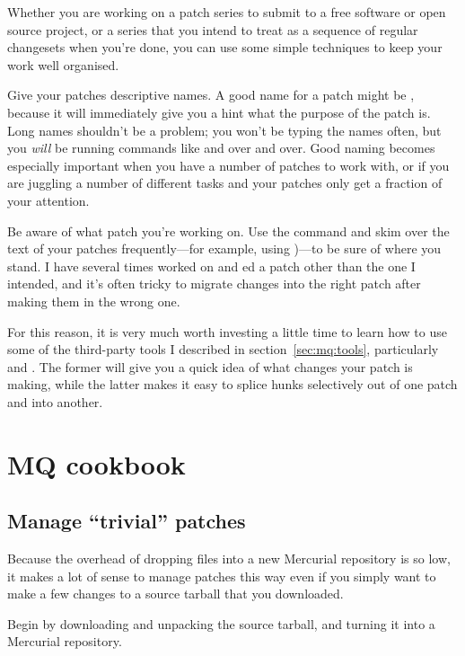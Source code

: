 Whether you are working on a patch series to submit to a free software
or open source project, or a series that you intend to treat as a
sequence of regular changesets when you're done, you can use some
simple techniques to keep your work well organised.

Give your patches descriptive names.  A good name for a patch might be
, because it will immediately give
you a hint what the purpose of the patch is.  Long names shouldn't be
a problem; you won't be typing the names often, but you \emph{will} be
running commands like  and  over and over.
Good naming becomes especially important when you have a number of
patches to work with, or if you are juggling a number of different
tasks and your patches only get a fraction of your attention.

Be aware of what patch you're working on.  Use the 
command and skim over the text of your patches frequently---for
example, using )---to be sure of where
you stand.  I have several times worked on and ed a
patch other than the one I intended, and it's often tricky to migrate
changes into the right patch after making them in the wrong one.

For this reason, it is very much worth investing a little time to
learn how to use some of the third-party tools I described in
section~\ref{sec:mq:tools}, particularly  and
.  The former will give you a quick idea of what
changes your patch is making, while the latter makes it easy to splice
hunks selectively out of one patch and into another.

\section{MQ cookbook}

\subsection{Manage ``trivial'' patches}

Because the overhead of dropping files into a new Mercurial repository
is so low, it makes a lot of sense to manage patches this way even if
you simply want to make a few changes to a source tarball that you
downloaded.

Begin by downloading and unpacking the source tarball,
and turning it into a Mercurial repository.

